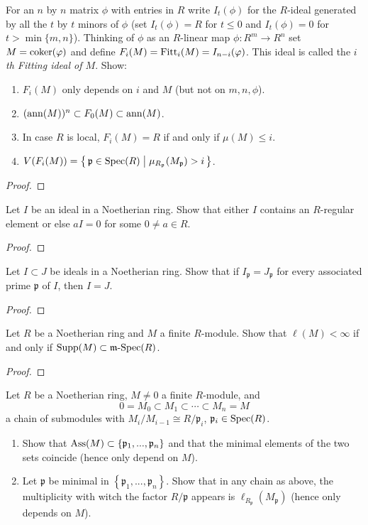 \begin{problem}
For an $n$ by $n$ matrix $\phi$ with entries in $R$ write
$I_t(\phi)$ for the $R$-ideal generated by all the $t$ by $t$
minors of $\phi$ (set $I_t(\phi)=R$ for $t\leq 0$ and
$I_t(\phi)=0$ for $t>\min\{m,n\}$). Thinking of $\phi$ as an
$R$-linear map $\phi\colon R^m\to R^n$ set $M=\operatorname{coker}(\varphi)$ and
define $F_i(M)=\operatorname{Fitt}_i(M)=I_{n-i}(\varphi)$. This ideal is called
the \emph{$i$th Fitting ideal of $M$}. Show:
\begin{enumerate}[label=(\alph*)]
\item $F_i(M)$ only depends on $i$ and $M$ (but not on
  $m,n,\phi$).
\item $(\operatorname{ann}(M))^n\subset F_0(M)\subset\operatorname{ann}(M)$.
\item In case $R$ is local, $F_i(M)=R$ if and only if $\mu(M)\leq
  i$.
\item
  $V(F_i(M))=
\left\{\,\mathfrak{p}\in\operatorname{Spec}(R)\;\middle|\;\mu_{R_{\mathfrak{p}}}(M_{\mathfrak{p}})>i\,\right\}$.
\end{enumerate}
\end{problem}
\begin{proof}
\end{proof}
\newpage
\begin{problem}
Let $I$ be an ideal in a Noetherian ring. Show that either $I$
contains an $R$-regular element or else $aI=0$ for some $0\neq
a\in R$.
\end{problem}
\begin{proof}
\end{proof}
\newpage
\begin{problem}
Let $I\subset J$ be ideals in a Noetherian ring. Show that if
$I_{\mathfrak{p}}=J_{\mathfrak{p}}$ for every associated prime
$\mathfrak{p}$ of $I$, then $I=J$.
\end{problem}
\begin{proof}
\end{proof}
\newpage
\begin{problem}
Let $R$ be a Noetherian ring and $M$ a finite $R$-module. Show
that $\ell(M)<\infty$ if and only  if
$\operatorname{Supp}(M)\subset\operatorname{\mathfrak{m}-Spec}(R)$.
\end{problem}
\begin{proof}
\end{proof}
\newpage
\begin{problem}
Let $R$ be a Noetherian ring, $M\neq 0$ a finite $R$-module, and
\[
0=M_0\subset M_1\subset \cdots\subset M_n=M
\]
a chain of submodules with $M_i/M_{i-1}\cong R/\mathfrak{p}_i$,
$\mathfrak{p}_i\in\operatorname{Spec}(R)$.
\begin{enumerate}[label=(\alph*)]
\item Show that
  $\operatorname{Ass}(M)\subset\left\{\mathfrak{p}_1,...,\mathfrak{p}_n\right\}$
  and that the minimal elements of the two sets coincide (hence
  only depend on $M$).
\item Let $\mathfrak{p}$ be minimal in
  $\left\{\mathfrak{p}_1,...,\mathfrak{p}_n\right\}$. Show that
  in any chain as above, the multiplicity with witch the factor
  $R/\mathfrak{p}$ appears is
  $\ell_{R_{\mathfrak{p}}}(M_{\mathfrak{p}})$ (hence only depends
  on $M$).
\end{enumerate}
\end{problem}
